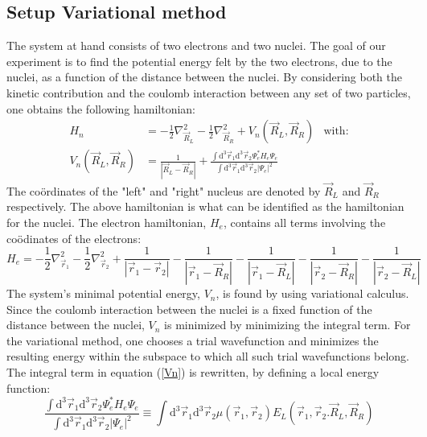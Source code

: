 \documentclass[a4paper,10pt]{article}
\begin{document}
	\subsection{Setup Variational method}
The system at hand consists of two electrons and two nuclei. The goal of our experiment is to find the potential energy felt by the two electrons, due to the nuclei, as a function of the distance between the nuclei. By considering both the kinetic contribution and the coulomb interaction between any set of two particles, one obtains the following hamiltonian:
	\begin{subequations}
	\begin{align}
	H_{n}  &=  -\frac{1}{2} \nabla^{2}_{\vec{R}_{L}}  -\frac{1}{2} \nabla^{2}_{\vec{R}_{R}} + V_{n}(\vec{R}_{L},\vec{R}_{R})  
	      	 & \text{with:}  \\
	V_{n}(\vec{R}_{L},\vec{R}_{R}) &= \frac{1}{|\vec{R}_{L}-\vec{R}_{R}|}  + \frac{ \int  \mathrm{d}^{3}\vec{r}_{1}\mathrm{d}^{3}\vec{r}_{2} \Psi_{e}^{*} H_{e} \Psi_{e} }{\int  \mathrm{d}^{3}\vec{r}_{1}\mathrm{d}^{3}\vec{r}_{2} |\Psi_{e}|^{2} }   \label{Vn}
	\end{align} 
	\end{subequations}
The co\"ordinates of the "left" and "right" nucleus are denoted by $\vec{R}_{L}$ and $\vec{R}_R$ respectively. 
The above hamiltonian is what can be identified as the hamiltonian for the nuclei. The electron hamiltonian, $H_{e}$, contains all terms involving the co\"odinates of the electrons:
	\begin{equation}
	H_{e} =  -\frac{1}{2} \nabla^{2}_{\vec{r}_{1}}  -\frac{1}{2} \nabla^{2}_{\vec{r}_{2}} + \frac{1}{| \vec{r}_1 -\vec{r}_2 |}  - \frac{1}{| \vec{r}_1 -\vec{R}_ R|} - \frac{1}{| \vec{r}_1 -\vec{R}_L |} - \frac{1}{| \vec{r}_2 -\vec{R}_ R|} - \frac{1}{| \vec{r}_2 -\vec{R}_L |}
	\label{Hamiltonian}
	\end{equation}
The system's minimal potential energy, $V_{n}$, is found by using variational calculus. Since the coulomb interaction between the nuclei is a fixed function of the distance between the nuclei, $V_{n}$ is minimized by minimizing the integral term. For the variational method, one chooses a trial wavefunction and minimizes the resulting energy within the subspace to which all such trial wavefunctions belong. The integral term in equation (\ref{Vn}) is rewritten, by defining a local energy function:
		\begin{equation}
		 \frac{ \int  \mathrm{d}^{3}\vec{r}_{1}\mathrm{d}^{3}\vec{r}_{2} \Psi_{e}^{*} H_{e} \Psi_{e} }{\int  \mathrm{d}^{3}\vec{r}_{1}\mathrm{d}^{3}\vec{r}_{2} |\Psi_{e}|^{2} }   \equiv \int \mathrm{d}^{3}\vec{r}_1  \mathrm{d}^{3}\vec{r}_2 \mu(\vec{r}_1,\vec{r}_2) E_{L}(\vec{r}_1,\vec{r}_{2}. \vec{R}_L,\vec{R}_{R}) 
		 \label{Importance Sampling}
		 \end{equation}
\end{document}
